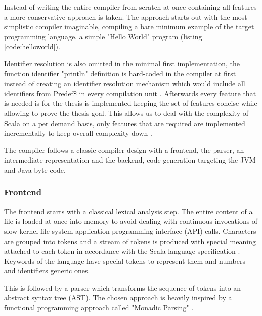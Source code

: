 \documentclass{VUMIFPSbakalaurinis}
\begin{document}

Instead of writing the entire compiler from scratch at once containing all features a more conservative approach is taken.
The approach starts out with the most simplistic compiler imaginable, compiling a bare minimum example of the target programming language, a simple "Hello World" program (listing \ref{code:helloworld}).



Identifier resolution is also omitted in the minimal first implementation, the function identifier "println" definition is hard-coded in the compiler at first instead of creating an identifier resolution mechanism which would include all identifiers from Predef\$ in every compilation unit \cite{Predef}.
Afterwards every feature that is needed is for the thesis is implemented keeping the set of features concise while allowing to prove the thesis goal.
This allows us to deal with the complexity of Scala on a per demand basis, only features that are required are implemented incrementally to keep overall complexity down \cite{IncrementalCompiler}.

The compiler follows a classic compiler design with a frontend, the parser, an intermediate representation and the backend, code generation targeting the JVM and Java byte code.

\subsubsection{Frontend}

The frontend starts with a classical lexical analysis step.
The entire content of a file is loaded at once into memory to avoid dealing with continuous invocations of slow kernel file system application programming interface (API) calls.
Characters are grouped into tokens and a stream of tokens is produced with special meaning attached to each token in accordance with the Scala language specification \cite{ScalaSpec}.
Keywords of the language have special tokens to represent them and numbers and identifiers generic ones.

This is followed by a parser which transforms the sequence of tokens into an abstract syntax tree (AST).
The chosen approach is heavily inspired by a functional programming approach called "Monadic Parsing" \cite{MonadicParsing}.
\end{document}
